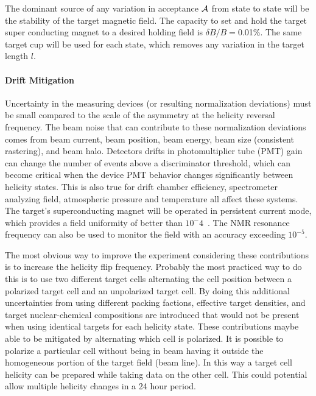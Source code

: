 The dominant source of any variation in acceptance ${\cal A}$ from state to state will be the stability of the target magnetic field.
The capacity to set and hold the target super conducting magnet
to a desired holding field is $\delta B /B=$0.01\%.  The same target cup will be used
for each state, which removes any variation in the target length $l$. 

\paragraph{Drift Mitigation}\mbox{}

Uncertainty in the measuring devices (or resulting normalization deviations) must be small compared to the
scale of the asymmetry at the helicity reversal frequency.  The beam noise that can contribute to these
normalization deviations comes from beam current, beam position, beam energy, beam size (consistent rastering), and beam halo.  Detectors drifts in photomultiplier tube (PMT) gain can change the number of events above
a discriminator threshold, which can become critical when the device PMT behavior changes significantly between
helicity states.  This is also true for drift chamber efficiency, spectrometer analyzing field,
atmospheric pressure and temperature all affect these systems.
The target's superconducting magnet will be operated in persistent current mode, which provides a field uniformity of better than $10^-4$~\cite{Keith:2003ca}. The NMR resonance frequency can also be used to monitor the field with an accuracy exceeding $10^{-5}$.


The most obvious way to improve the experiment considering these contributions is to increase the helicity flip frequency.
Probably the most practiced way to do this is to use two different target cells alternating the cell position between a
polarized target cell and an unpolarized target cell.  By doing this additional uncertainties from using different packing factions,
effective target densities, and target nuclear-chemical compositions are introduced that would not be present when using identical targets for each helicity state.
These contributions maybe able to be mitigated by alternating which cell is polarized.  It is possible to polarize a particular cell
without being in beam having it outside the homogeneous portion of the target field (beam line).  In this way a target cell helicity can be
prepared while taking data on the other cell.  This could potential allow multiple helicity changes in a 24 hour period.

